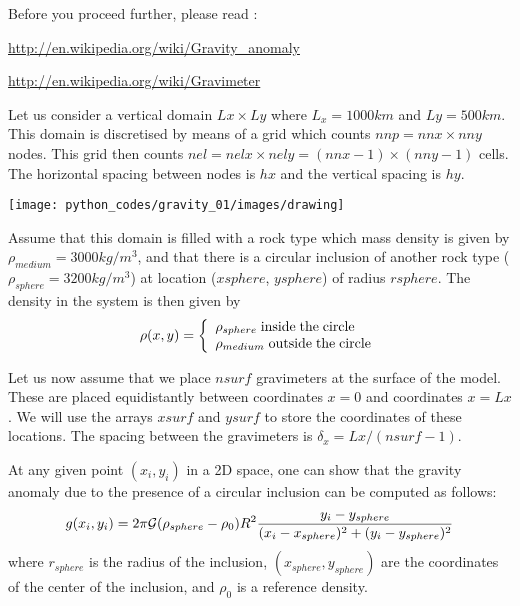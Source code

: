 Before you proceed further, please read :

\url{http://en.wikipedia.org/wiki/Gravity_anomaly}

\url{http://en.wikipedia.org/wiki/Gravimeter}

Let us consider a vertical domain $Lx \times Ly$ where $L_x=1000km$
and $Ly=500km$. This domain is discretised by means of a grid which counts $nnp= nnx \times nny$ nodes.
This grid then counts $nel=nelx \times nely = (nnx-1)\times(nny-1)$ cells.
The horizontal spacing between nodes is $hx$ and the vertical spacing is $hy$.

\begin{center}
\texttt{[image: python\_codes/gravity\_01/images/drawing]}
\end{center}

Assume that this domain is filled with a rock type which 
mass density is given by $\rho_{medium}=3000kg/m^3$, 
and that there is a circular inclusion of another rock type  ($\rho_{sphere}=3200kg/m^3$) 
at location ($xsphere$, $ysphere$) of radius $rsphere$.
The density in the system is then given by 
\[
\rho(x,y) = 
\left\{
\begin{array}{l}
\rho_{sphere} \; {\rm  inside \; the\; circle} \\
\rho_{medium} \; {\rm outside \; the\; circle}
\end{array}
\right.
\]

Let us now assume that we place $nsurf$ gravimeters at the surface of the model. These are placed 
equidistantly between coordinates $x=0$ and coordinates $x=Lx$. We will use the arrays $xsurf$ and $ysurf$
to store the coordinates of these locations. 
The spacing between the gravimeters is $\delta_x=Lx/(nsurf-1)$.

At any given point $(x_i,y_i)$ in a 2D space, one can show that 
the gravity anomaly due to the presence of a 
circular inclusion can be computed as follows:
\begin{equation}
g(x_i,y_i)={2 \pi {\cal G} (\rho_{sphere}-\rho_0) R^2}\frac{y_i-y_{sphere}}{(x_i-x_{sphere})^2+(y_i-y_{sphere})^2}
\end{equation}
where $r_{sphere}$ is the radius of the inclusion, $(x_{sphere},y_{sphere})$ 
are the coordinates of the center of the inclusion, and
$\rho_0$ is a reference density.

